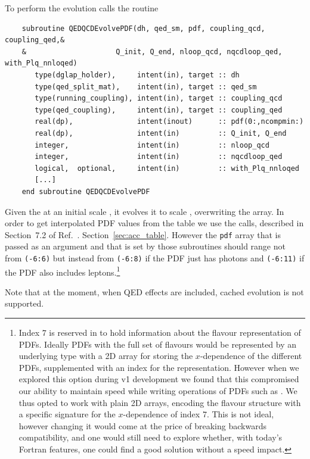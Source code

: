 To perform the evolution  calls the routine 
\begin{lstlisting}
    subroutine QEDQCDEvolvePDF(dh, qed_sm, pdf, coupling_qcd, coupling_qed,&
    &                     Q_init, Q_end, nloop_qcd, nqcdloop_qed, with_Plq_nnloqed)
       type(dglap_holder),     intent(in), target :: dh
       type(qed_split_mat),    intent(in), target :: qed_sm
       type(running_coupling), intent(in), target :: coupling_qcd
       type(qed_coupling),     intent(in), target :: coupling_qed
       real(dp),               intent(inout)      :: pdf(0:,ncompmin:)
       real(dp),               intent(in)         :: Q_init, Q_end
       integer,                intent(in)         :: nloop_qcd
       integer,                intent(in)         :: nqcdloop_qed
       logical,  optional,     intent(in)         :: with_Plq_nnloqed
       [...]
    end subroutine QEDQCDEvolvePDF
\end{lstlisting}
Given the  at an initial scale , it
evolves it to scale , overwriting the  array. 
%
In order to get interpolated PDF values from the table we use the
 calls, described in
\ifreleasenote
Section~7.2 of Ref.~\cite{Salam:2008qg}.
\else
Section~\ref{sec:acc_table}.
\fi
%
However the \texttt{pdf} array that is passed as an argument and that
is set by those subroutines should range not from \texttt{(-6:6)} but
instead from \texttt{(-6:8)} if the PDF just has photons and
\texttt{(-6:11)} if the PDF also includes leptons.\footnote{Index $7$
  is reserved in \hoppet to hold information about the flavour
  representation of PDFs.
  Ideally PDFs with the full set of flavours would be represented by an
  underlying type with a 2D array for storing the $x$-dependence of
  the different PDFs, supplemented with an index for the representation.
  However when we explored this option during v1 development we found
  that this compromised our ability to maintain speed while writing
  operations of PDFs such as .
  We thus opted to work with plain 2D arrays, encoding the flavour
  structure with a specific signature for the $x$-dependence of index
  7.
  This is not ideal, however changing it would come at the price of
  breaking backwards compatibility, and one would still need to
  explore whether, with today's Fortran features, one could find a
  good solution without a speed impact.}

Note that at the moment, when QED effects are included, cached
evolution is not supported.



